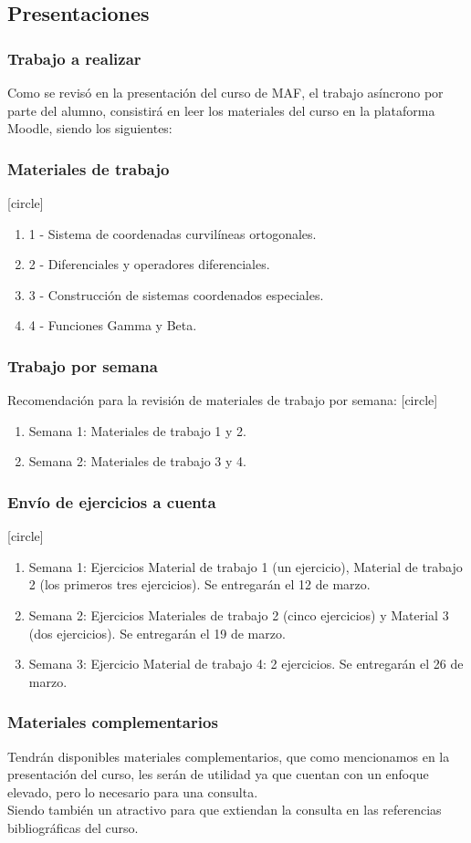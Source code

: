 \documentclass[12pt]{beamer}
\begin{document}
\subsection{Presentaciones}
\begin{frame}
\frametitle{Trabajo a realizar}
Como se revisó en la presentación del curso de MAF, el trabajo asíncrono por parte del alumno, consistirá en leer los materiales del curso en la plataforma Moodle, siendo los siguientes:
\end{frame}
\begin{frame}
\frametitle{Materiales de trabajo}
[circle]
\begin{enumerate}[<+->]
\item 1 - Sistema de coordenadas curvilíneas ortogonales.
\item 2 - Diferenciales y operadores diferenciales.
\item 3 - Construcción de sistemas coordenados especiales.
\item 4 - Funciones Gamma y Beta.
\end{enumerate}
\end{frame}
\begin{frame}
\frametitle{Trabajo por semana}
Recomendación para la revisión de materiales de trabajo por semana:
[circle]
\begin{enumerate}[<+->]
\item Semana 1: Materiales de trabajo 1 y 2.
\item Semana 2: Materiales de trabajo 3 y 4.
\end{enumerate}
\end{frame}
\begin{frame}
\frametitle{Envío de ejercicios a cuenta}
[circle]
\begin{enumerate}[<+->]
\item Semana 1: Ejercicios Material de trabajo 1 (un ejercicio), Material de trabajo 2 (los primeros tres ejercicios). Se entregarán el 12 de marzo.
\item Semana 2: Ejercicios Materiales de trabajo 2 (cinco ejercicios) y Material 3 (dos ejercicios). Se entregarán el 19 de marzo.
\item Semana 3: Ejercicio Material de trabajo 4: 2 ejercicios. Se entregarán el 26 de marzo.
\end{enumerate}
\end{frame}
\begin{frame}
\frametitle{Materiales complementarios}
Tendrán disponibles materiales complementarios, que como mencionamos en la presentación del curso, les serán de utilidad ya que cuentan con un enfoque elevado, pero lo necesario para una consulta.
\\
\bigskip
Siendo también un atractivo para que extiendan la consulta en las referencias bibliográficas del curso.
\end{frame}
\end{document}
